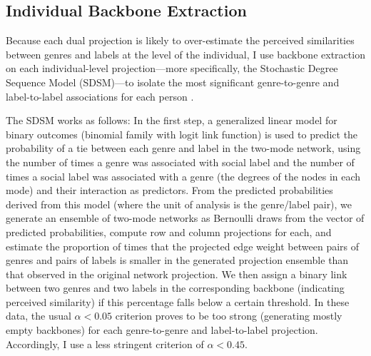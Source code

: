 \documentclass[12pt]{article}
\begin{document}
\subsection*{Individual Backbone Extraction}
Because each dual projection is likely to over-estimate the perceived similarities between genres and labels at the level of the individual, I use backbone extraction on each individual-level projection---more specifically, the Stochastic Degree Sequence Model (SDSM)---to isolate the most significant genre-to-genre and label-to-label associations for each person \citep{neal2014backbone-b29}. 

The SDSM works as follows: In the first step, a generalized linear model for binary outcomes (binomial family with logit link function) is used to predict the probability of a tie between each genre and label in the two-mode network, using the number of times a genre was associated with social label and the number of times a social label was associated with a genre (the degrees of the nodes in each mode) and their interaction as predictors. From the predicted probabilities derived from this model (where the unit of analysis is the genre/label pair), we generate an ensemble of two-mode networks as Bernoulli draws from the vector of predicted probabilities, compute row and column projections for each, and estimate the proportion of times that the projected edge weight between pairs of genres and pairs of labels is smaller in the generated projection ensemble than that observed in the original network projection. We then assign a binary link between two genres and two labels in the corresponding backbone (indicating perceived similarity) if this percentage falls below a certain threshold. In these data, the usual $\alpha < 0.05$ criterion proves to be too strong (generating mostly empty backbones) for each genre-to-genre and label-to-label projection. Accordingly, I use a less stringent criterion of $\alpha < 0.45$.  
\end{document}

